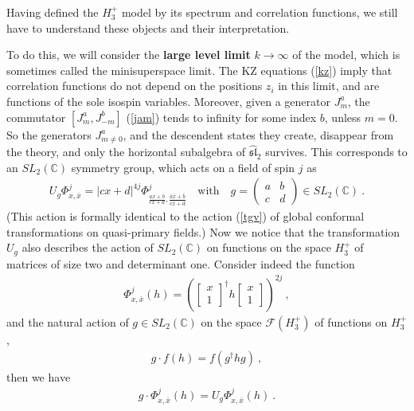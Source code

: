 \documentclass[12pt,a4paper,notitlepage]{report}
\newcommand \C {\mathbb{C}}
\numberwithin{equation}{section}
\theoremstyle{break}
\begin{document}
Having defined the $H_3^+$ model by its spectrum and correlation functions, we still have to understand these objects and their interpretation.  

To do this, we will consider the \textbf{\boldmath large level limit} $k\rightarrow \infty$ of the model, which is sometimes called the minisuperspace limit. 
The KZ equations (\ref{kz}) imply that correlation functions do not depend on the positions $z_i$ in this limit, and are functions of the sole isospin variables. 
Moreover, given a generator $J^a_m$, the commutator $[J^a_m,J^b_{-m}]$ (\ref{jam})  tends to infinity for some index $b$, unless $m=0$. 
So the generators $J^a_{m\neq 0}$, and the descendent states they create, disappear from the theory, and only the horizontal subalgebra of $\widehat{\mathfrak{sl}}_2$ survives. This corresponds to an $SL_2(\C)$ symmetry group, which acts on a field of spin $j$ as 
\begin{align}
 U_g\Phi^j_{x,\bar{x}} = |cx+d|^{4j}\Phi^j_{\frac{ax+b}{cx+d},\frac{\bar{a}\bar{x}+\bar{b}}{\bar{c}\bar{x}+\bar{d}}} \quad \text{with} \quad g = \left(\begin{array}{cc} a & b \\ c & d \end{array}\right) \in SL_2(\C)\ .
\label{ugp}
\end{align}
(This action is formally identical to the action (\ref{tgv}) of global conformal transformations on quasi-primary fields.)
Now we notice that the transformation $U_g$ also describes the action of $SL_2(\C)$ on functions on the space $H_3^+$ of matrices of size two and determinant one. Consider indeed the function
\begin{align}
 \Phi^j_{x,\bar{x}}(h) = \left(\begin{bmatrix}
                                x \\ 1
                               \end{bmatrix}^\dagger 
h \begin{bmatrix}
   x \\ 1 
  \end{bmatrix}
 \right)^{2j}\ ,
\end{align}
and the natural action of $g\in SL_2(\C)$ on the space $\mathcal{F}(H_3^+)$ of functions on $H_3^+$,
\begin{align}
 g\cdot f(h) = f(g^\dagger h g)\ ,
\end{align}
then we have 
\begin{align}
 g\cdot \Phi^j_{x,\bar{x}}(h) = U_g \Phi^j_{x,\bar{x}}(h)\ .
\end{align}
\end{document}
